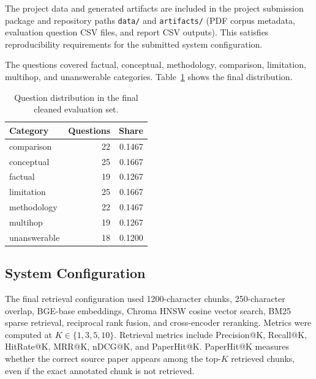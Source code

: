 \documentclass[11pt]{article}
\newcommand{\tablefont}{\footnotesize}
\begin{document}
The project data and generated artifacts are included in the project submission package and repository paths \texttt{data/} and \texttt{artifacts/} (PDF corpus metadata, evaluation question CSV files, and report CSV outputs). This satisfies reproducibility requirements for the submitted system configuration.

The questions covered factual, conceptual, methodology, comparison, limitation, multihop, and unanswerable categories. Table~\ref{tab:question-dist} shows the final distribution.

\begin{table}[t]
\centering
\tablefont
\setlength{\tabcolsep}{4pt}
\begin{tabular}{lrr}
\hline
\textbf{Category} & \textbf{Questions} & \textbf{Share} \\
\hline
comparison & 22 & 0.1467 \\
conceptual & 25 & 0.1667 \\
factual & 19 & 0.1267 \\
limitation & 25 & 0.1667 \\
methodology & 22 & 0.1467 \\
multihop & 19 & 0.1267 \\
unanswerable & 18 & 0.1200 \\
\hline
\end{tabular}
\caption{Question distribution in the final cleaned evaluation set.}
\label{tab:question-dist}
\end{table}

\subsection{System Configuration}

The final retrieval configuration used 1200-character chunks, 250-character overlap, BGE-base embeddings, Chroma HNSW cosine vector search, BM25 sparse retrieval, reciprocal rank fusion, and cross-encoder reranking. Metrics were computed at $K \in \{1,3,5,10\}$. Retrieval metrics include Precision@K, Recall@K, HitRate@K, MRR@K, nDCG@K, and PaperHit@K. PaperHit@K measures whether the correct source paper appears among the top-$K$ retrieved chunks, even if the exact annotated chunk is not retrieved.
\end{document}
